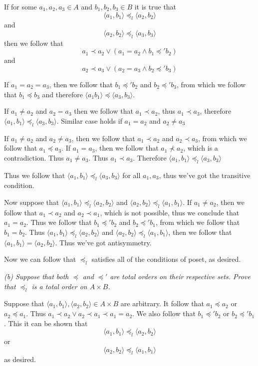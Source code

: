 \documentclass[11pt,oneside,titlepage]{book}
\newcommand{\eangle}[1]{\langle #1 \rangle}
\begin{document}
If for some $a_1, a_2, a_3 \in A$ and $b_1, b_2, b_3 \in B$ it is true that
$$\eangle{a_1, b_1} \preceq_l \eangle{a_2, b_2}$$
and
$$ \eangle{a_2, b_2} \preceq_l \eangle{a_3, b_3} $$
then we follow that
$$a_1 \prec a_2 \lor (a_1 = a_2 \land b_1 \preceq' b_2)$$
and
$$a_2 \prec a_3 \lor (a_2 = a_3 \land b_2 \preceq' b_3)$$

If $a_1 = a_2 = a_3$, then we follow that $b_1 \preceq' b_2$ and $b_2 \preceq' b_3$, from which
we follow that $b_1 \preceq b_3$ and therefore $\eangle{a_1 b_1} \preceq \eangle{a_3, b_3}$.

If $a_1 \neq a_2$ and $a_2 = a_3$ then we follow that $a_1 \prec a_2$, thus $a_1 \prec a_3$,
therefore $\eangle{a_1, b_1} \preceq_l \eangle{a_3, b_3}$. Similar case holds if
$a_1 = a_2$ and $a_2 \neq a_3$

If $a_1 \neq a_2$ and $a_2 \neq a_3$, then we follow that $a_1 \prec a_2$ and $a_2 \prec a_3$,
from which we follow that $a_1 \preceq a_3$. If $a_1 = a_3$, then we follow that
$a_1 \not \prec a_2$, which is a contradiction. Thus $a_1 \neq a_3$. Thus $a_1 \prec a_3$.
Therefore $\eangle{a_1, b_1} \preceq_l \eangle{a_3, b_3}$

Thus we follow that $\eangle{a_1, b_1} \preceq_l \eangle{a_3, b_3}$ for all $a_1, a_3$, thus
we've got the transitive condition.

Now suppose that $\eangle{a_1, b_1} \preceq_l \eangle{a_2, b_2}$ and
$\eangle{a_2, b_2} \preceq_l \eangle{a_1, b_1}$. If $a_1 \neq a_2$, then we follow that
$a_1 \prec a_2$ and $a_2 \prec a_1$, which is not possible, thus we conclude that $a_1 = a_2$.
Thus we follow that $b_1 \preceq' b_2$ and $b_2 \preceq' b_1$, from which we follow that
$b_1 = b_2$. Thus $\eangle{a_1, b_1} \preceq_l \eangle{a_2, b_2}$ and
$\eangle{a_2, b_2} \preceq_l \eangle{a_1, b_1}$, then we follow that
$\eangle{a_1, b_1} = \eangle{a_2, b_2}$. Thus we've got antisymmetry.

Now we can follow that $\preceq_l$ satisfies all of the conditions of poset, as desired.

\textit{(b) Suppose that both $\preceq$ and $\preceq'$ are total orders on their respective sets.
  Prove that $\preceq_l$ is a total order on $A \times B$.}

Suppose that $\eangle{a_1, b_1}, \eangle{a_2, b_2}  \in A \times B$ are arbitrary. It follow that
$a_1 \preceq a_2$ or $a_2 \preceq a_1$. Thus $a_1 \prec a_2 \lor a_2 \prec a_1 \prec a_1 = a_2$.
We also follow that $b_1 \preceq' b_2$ or $b_2 \preceq' b_1$. This it can be shown that
$$\eangle{a_1, b_1} \preceq_l \eangle{a_2, b_2}$$
or
$$\eangle{a_2, b_2} \preceq_l \eangle{a_1, b_1}$$
as desired.
\end{document}
